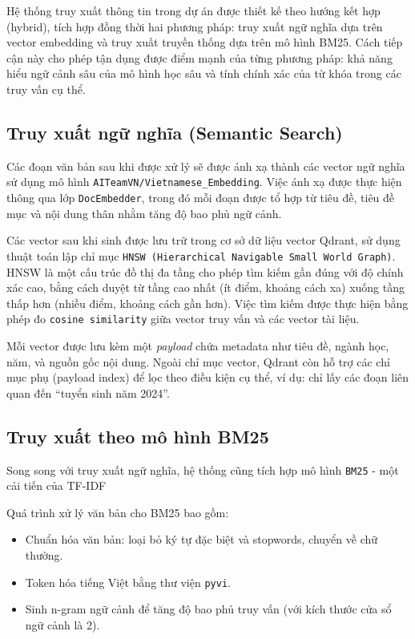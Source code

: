 Hệ thống truy xuất thông tin trong dự án được thiết kế theo hướng kết hợp (hybrid), tích hợp đồng thời hai phương pháp: truy xuất ngữ nghĩa dựa trên vector embedding và truy xuất truyền thống dựa trên mô hình BM25. Cách tiếp cận này cho phép tận dụng được điểm mạnh của từng phương pháp: khả năng hiểu ngữ cảnh sâu của mô hình học sâu và tính chính xác của từ khóa trong các truy vấn cụ thể.

\subsection{Truy xuất ngữ nghĩa (Semantic Search)}

Các đoạn văn bản sau khi được xử lý sẽ được ánh xạ thành các vector ngữ nghĩa sử dụng mô hình \texttt{AITeamVN/Vietnamese\_Embedding}. Việc ánh xạ được thực hiện thông qua lớp \texttt{DocEmbedder}, trong đó mỗi đoạn được tổ hợp từ tiêu đề, tiêu đề mục và nội dung thân nhằm tăng độ bao phủ ngữ cảnh.

Các vector sau khi sinh được lưu trữ trong cơ sở dữ liệu vector Qdrant, sử dụng thuật toán lập chỉ mục \texttt{HNSW (Hierarchical Navigable Small World Graph)}. HNSW là một cấu trúc đồ thị đa tầng cho phép tìm kiếm gần đúng với độ chính xác cao, bằng cách duyệt từ tầng cao nhất (ít điểm, khoảng cách xa) xuống tầng thấp hơn (nhiều điểm, khoảng cách gần hơn). Việc tìm kiếm được thực hiện bằng phép đo \texttt{cosine similarity} giữa vector truy vấn và các vector tài liệu.

Mỗi vector được lưu kèm một \textit{payload} chứa metadata như tiêu đề, ngành học, năm, và nguồn gốc nội dung. Ngoài chỉ mục vector, Qdrant còn hỗ trợ các chỉ mục phụ (payload index) để lọc theo điều kiện cụ thể, ví dụ: chỉ lấy các đoạn liên quan đến ``tuyển sinh năm 2024''.

\subsection{Truy xuất theo mô hình BM25}

Song song với truy xuất ngữ nghĩa, hệ thống cũng tích hợp mô hình \texttt{BM25} - một cải tiến của TF-IDF

Quá trình xử lý văn bản cho BM25 bao gồm:

\begin{itemize}
    \item Chuẩn hóa văn bản: loại bỏ ký tự đặc biệt và stopwords, chuyển về chữ thường.
    \item Token hóa tiếng Việt bằng thư viện \texttt{pyvi}.
    \item Sinh n-gram ngữ cảnh để tăng độ bao phủ truy vấn (với kích thước cửa sổ ngữ cảnh là 2).
\end{itemize}

